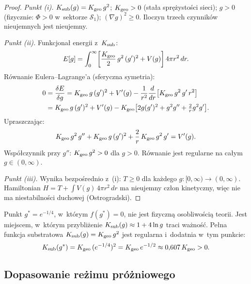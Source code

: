 \begin{proof}
\emph{Punkt (i).}
$K_{\rm sub}(g) = K_{\rm geo}\,g^2$; $K_{\rm geo} > 0$
(stała sprężystości sieci); $g > 0$ (fizycznie: $\Phi > 0$
w~sektorze $\mathcal{S}_1$); $(\nabla g)^2 \geq 0$.
Iloczyn trzech czynników nieujemnych jest nieujemny.

\medskip
\emph{Punkt (ii).}
Funkcjonał energii z~$K_{\rm sub}$:
\begin{equation}
  E[g] = \int_0^\infty\!
    \left[\frac{K_{\rm geo}}{2}\,g^2\,(g')^2 + V(g)\right]
    4\pi r^2\,dr.
\end{equation}
Równanie Eulera--Lagrange'a (sferyczna symetria):
\begin{align}
  0 &= \frac{\delta E}{\delta g}
     = K_{\rm geo}\,g\,(g')^2 + V'(g)
     - \frac{1}{r^2}\frac{d}{dr}\!\left[K_{\rm geo}\,g^2\,g'\,r^2\right] \\
    &= K_{\rm geo}\,g\,(g')^2 + V'(g)
     - K_{\rm geo}\bigl[2g(g')^2 + g^2 g'' + \tfrac{2}{r}g^2 g'\bigr].
\end{align}
Upraszczając:
\[
  K_{\rm geo}\,g^2\,g''
  + K_{\rm geo}\,g\,(g')^2
  + \frac{2}{r}\,K_{\rm geo}\,g^2\,g'
  = V'(g).
\]
Współczynnik przy $g''$: $K_{\rm geo}\,g^2 > 0$ dla $g > 0$.
Równanie jest regularne na całym $g \in (0,\infty)$.

\medskip
\emph{Punkt (iii).}
Wynika bezpośrednio z~(i): $T \geq 0$ dla każdego
$g : [0,\infty) \to (0,\infty)$.
Hamiltonian $H = T + \int V(g)\,4\pi r^2\,dr$
ma nieujemny człon kinetyczny, więc nie ma niestabilności
duchowej (Ostrogradski).
\end{proof}

\begin{corollary}[Osobliwość $f(g^*) = 0$ jest artefaktem]\label{cor:ghost-artifact}
Punkt $g^* = e^{-1/4}$, w~którym $f(g^*) = 0$,
nie jest fizyczną osobliwością teorii.
Jest miejscem, w~którym przybliżenie
$K_{\rm sub}(g) \approx 1 + 4\ln g$ traci ważność.
Pełna funkcja substratowa $K_{\rm sub}(g) = K_{\rm geo}\,g^2$
jest regularna i~dodatnia w~tym punkcie:
\begin{equation}
  K_{\rm sub}(g^*) = K_{\rm geo}\,(e^{-1/4})^2
  = K_{\rm geo}\,e^{-1/2} \approx 0{,}607\,K_{\rm geo} > 0.
\end{equation}
\end{corollary}

\subsection{Dopasowanie reżimu próżniowego}\label{ssec:matching}

